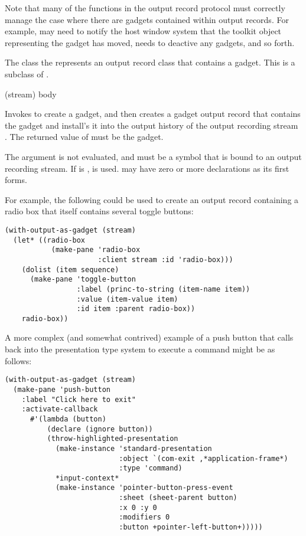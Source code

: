 Note that many of the functions in the output record protocol must correctly
manage the case where there are gadgets contained within output records.  For
example,  may need to notify the host window
system that the toolkit object representing the gadget has moved,
 needs to deactive any gadgets, and so forth.


The class the represents an output record class that contains a gadget.  This is
a subclass of .

 {(stream) \body body}

Invokes  to create a gadget, and then creates a gadget output record
that contains the gadget and install's it into the output history of the output
recording stream .  The returned value of  must be the
gadget.

The  argument is not evaluated, and must be a symbol that is bound to
an output recording stream.  If  is ,  is
used.   may have zero or more declarations as its first forms.

For example, the following could be used to create an output record containing a
radio box that itself contains several toggle buttons:

\begin{verbatim}
(with-output-as-gadget (stream)
  (let* ((radio-box
           (make-pane 'radio-box 
                      :client stream :id 'radio-box)))
    (dolist (item sequence)
      (make-pane 'toggle-button 
                 :label (princ-to-string (item-name item))
                 :value (item-value item)
                 :id item :parent radio-box))
    radio-box))
\end{verbatim}

A more complex (and somewhat contrived) example of a push button that calls back
into the presentation type system to execute a command might be as follows:

\begin{verbatim}
(with-output-as-gadget (stream)
  (make-pane 'push-button
    :label "Click here to exit"
    :activate-callback
      #'(lambda (button)
          (declare (ignore button))
          (throw-highlighted-presentation
            (make-instance 'standard-presentation
                           :object `(com-exit ,*application-frame*)
                           :type 'command)
            *input-context*
            (make-instance 'pointer-button-press-event
                           :sheet (sheet-parent button)
                           :x 0 :y 0
                           :modifiers 0
                           :button +pointer-left-button+)))))
\end{verbatim}
